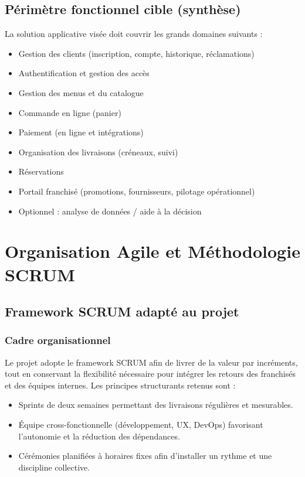 \section{Périmètre fonctionnel cible (synthèse)}
La solution applicative visée doit couvrir les grands domaines suivants :
\begin{itemize}
    \item Gestion des clients (inscription, compte, historique, réclamations)
    \item Authentification et gestion des accès
    \item Gestion des menus et du catalogue
    \item Commande en ligne (panier)
    \item Paiement (en ligne et intégrations)
    \item Organisation des livraisons (créneaux, suivi)
    \item Réservations
    \item Portail franchisé (promotions, fournisseurs, pilotage opérationnel)
    \item Optionnel : analyse de données / aide à la décision
\end{itemize}


\chapter{Organisation Agile et Méthodologie SCRUM}

\section{Framework SCRUM adapté au projet}

\subsection{Cadre organisationnel}
Le projet adopte le framework SCRUM afin de livrer de la valeur par incréments, tout en conservant la flexibilité nécessaire pour intégrer les retours des franchisés et des équipes internes. Les principes structurants retenus sont :
\begin{itemize}
    \item Sprints de deux semaines permettant des livraisons régulières et mesurables.
    \item Équipe cross-fonctionnelle (développement, UX, DevOps) favorisant l’autonomie et la réduction des dépendances.
    \item Cérémonies planifiées à horaires fixes afin d’installer un rythme et une discipline collective.
\end{itemize}

